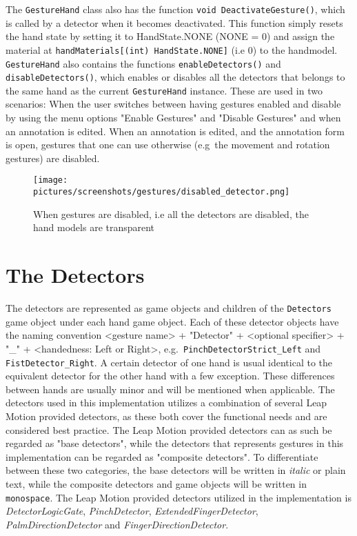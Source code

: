 The \texttt{GestureHand} class also has the function \texttt{void DeactivateGesture()}, which is called by a detector when it becomes deactivated. 
This function simply resets the hand state by setting it to HandState.NONE (NONE = 0) and assign the material at \texttt{handMaterials[(int) HandState.NONE]} (i.e 0) to the
handmodel. \texttt{GestureHand} also contains the functions \texttt{enableDetectors()} and \texttt{disableDetectors()}, which 
enables or disables all the detectors that belongs to the same hand as the current \texttt{GestureHand} instance. These are used in two scenarios:
When the user switches between having gestures enabled and disable by using the menu options "Enable Gestures" and "Disable Gestures" and when an annotation 
is edited. When an annotation is edited, and the annotation form is open, gestures that one can use otherwise (e.g~the movement and rotation gestures) are disabled.

\begin{figure}%
	\texttt{[image: pictures/screenshots/gestures/disabled\_detector.png]}
	\caption[Disabled gestures]{When gestures are disabled, i.e all the detectors are disabled, the hand models are transparent}
	\label{fig:disabled_detector}
\end{figure} 

 
\section{The Detectors}
The detectors are represented as game objects and children of the \texttt{Detectors} game object under each hand game object. 
Each of these detector objects have the naming convention <gesture name> + "Detector" + <optional specifier> + "\_" + <handedness: Left or Right>, 
e.g.~\texttt{PinchDetectorStrict\_Left} and \texttt{FistDetector\_Right}. A certain detector of one hand is usual identical to the equivalent detector for the 
other hand with a few exception. These differences between hands are usually minor and will be mentioned when applicable. The detectors used in this implementation
utilizes a combination of several Leap Motion provided detectors, as these both cover the functional needs and are considered best practice. 
The Leap Motion provided detectors can as such be regarded as "base detectors", while the detectors that represents gestures in this implementation
can be regarded as "composite detectors". To differentiate between these two categories, the base detectors will be written in \textit{italic} or plain text, while
the composite detectors and game objects will be written in \texttt{monospace}.
The Leap Motion provided detectors utilized in the implementation is \textit{DetectorLogicGate}, \textit{PinchDetector}, \textit{ExtendedFingerDetector}, 
\textit{PalmDirectionDetector} and \textit{FingerDirectionDetector}.

